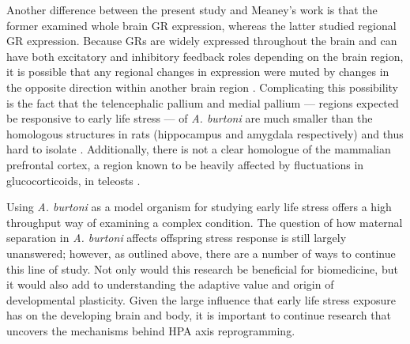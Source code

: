 \documentclass[12pt,twoside]{reedthesis}
\begin{document}
Another difference between the present study and Meaney's work is that the
former examined whole brain GR expression, whereas the latter studied regional
GR expression. Because GRs are widely expressed throughout the brain and can
have both excitatory and inhibitory feedback roles depending on the brain
region, it is possible that any regional changes in expression were muted by
changes in the opposite direction within another brain region \citep{2017Nrid,
  herman_limbic_2005}. Complicating this possibility is the fact that the telencephalic pallium and medial
pallium --- regions expected be responsive to early life stress --- of
\textit{A. burtoni} are much smaller than the homologous structures in rats
(hippocampus and amygdala respectively) and thus hard to isolate \citep{salas_neuropsychology_2006}. Additionally,
there is not a clear homologue of the mammalian prefrontal cortex, a region
known to be heavily affected by fluctuations in glucocorticoids, in teleosts
\citep{lupien_effects_2009, yamamoto_studies_2009}. 

Using \textit{A. burtoni} as a model organism for studying early life
stress offers a high throughput way of examining a complex condition. The question of how maternal separation in \textit{A.
  burtoni} affects offspring stress response is still largely unanswered;
however, as outlined above, there are a number of ways to continue this line of
study. Not
only would this research be beneficial for biomedicine, but it would also add to
understanding the adaptive value and origin of developmental plasticity. Given the large influence that early life stress exposure has on the developing
brain and body, it is important to continue research that uncovers the
mechanisms behind HPA axis reprogramming.



\end{document}
